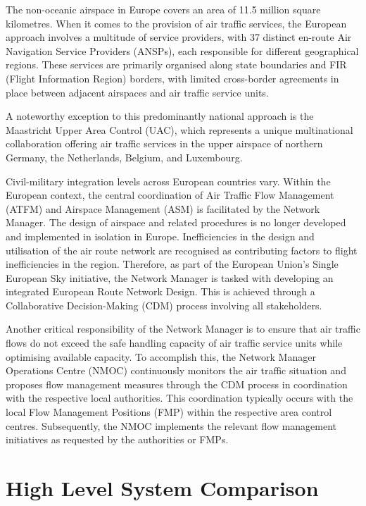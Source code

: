 \documentclass[
  a4paper,
  DIV=11,
  numbers=noendperiod]{scrreport}
\begin{document}
The non-oceanic airspace in Europe covers an area of 11.5 million square
kilometres. When it comes to the provision of air traffic services, the
European approach involves a multitude of service providers, with 37
distinct en-route Air Navigation Service Providers (ANSPs), each
responsible for different geographical regions. These services are
primarily organised along state boundaries and FIR (Flight Information
Region) borders, with limited cross-border agreements in place between
adjacent airspaces and air traffic service units.

A noteworthy exception to this predominantly national approach is the
Maastricht Upper Area Control (UAC), which represents a unique
multinational collaboration offering air traffic services in the upper
airspace of northern Germany, the Netherlands, Belgium, and Luxembourg.

Civil-military integration levels across European countries vary. Within
the European context, the central coordination of Air Traffic Flow
Management (ATFM) and Airspace Management (ASM) is facilitated by the
Network Manager. The design of airspace and related procedures is no
longer developed and implemented in isolation in Europe. Inefficiencies
in the design and utilisation of the air route network are recognised as
contributing factors to flight inefficiencies in the region. Therefore,
as part of the European Union's Single European Sky initiative, the
Network Manager is tasked with developing an integrated European Route
Network Design. This is achieved through a Collaborative Decision-Making
(CDM) process involving all stakeholders.

Another critical responsibility of the Network Manager is to ensure that
air traffic flows do not exceed the safe handling capacity of air
traffic service units while optimising available capacity. To accomplish
this, the Network Manager Operations Centre (NMOC) continuously monitors
the air traffic situation and proposes flow management measures through
the CDM process in coordination with the respective local authorities.
This coordination typically occurs with the local Flow Management
Positions (FMP) within the respective area control centres.
Subsequently, the NMOC implements the relevant flow management
initiatives as requested by the authorities or FMPs.

\hypertarget{high-level-system-comparison}{%
\section{High Level System
Comparison}\label{high-level-system-comparison}}
\end{document}
